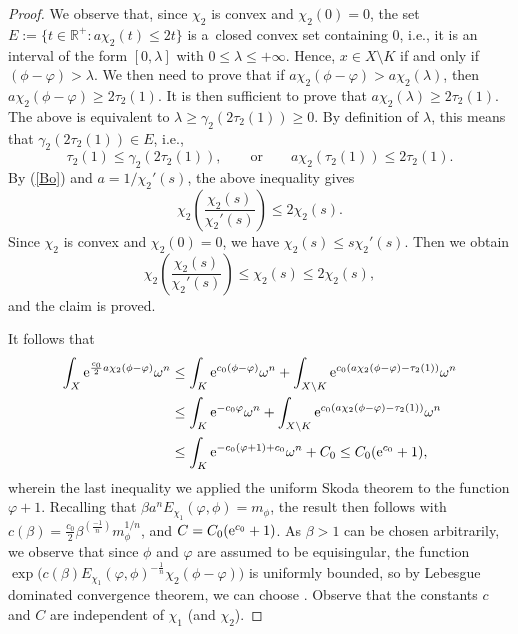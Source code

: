 \begin{proof}
We observe that, since $\chi_2$ is convex and $\chi_2(0) = 0$, the set $E:=\{ t \in \mathbb{R}^+ \colon a\chi_2(t) \leq 2 t \}$ is a~closed convex set containing $0$, i.e., it is an interval of the form $[0, \lambda]$ with $0 \leq \lambda \leq + \infty$. Hence, $x\in X\setminus K$ if and only if $(\phi-\varphi)>\lambda$.
We then need to prove that if $ a\chi_2( \phi - \varphi) > a\chi_2( \lambda)$,
then
$ a \chi_2( \phi - \varphi) \geq {2 \tau_2(1)}$. It is then sufficient to prove that $a\chi_2( \lambda) \geq 2 \tau_2(1)$. The above is equivalent to $ \lambda \geq \gamma_2(2 \tau_2(1)) \geq 0$. By definition of $\lambda$, this means that $\gamma_2(2 \tau_2(1))\in E$, i.e.,
\[\tau_2(1) \leq \gamma_2(2 \tau_2(1)),\qquad \text{or} \qquad a \chi_2(\tau_2(1)) \leq 2 \tau_2(1).\]
By (\ref{Bo}) and $a=1/\chi_2'(s)$, the above inequality gives
\[\chi_2\left(\frac{\chi_2( s)}{\chi_2' (s)} \right) \leq 2 \chi_2(s).\]
Since $\chi_2$ is convex and $\chi_2(0) = 0$, we have
$\chi_2(s) \leq s \chi_2'(s)$.
Then we obtain
\[ \chi_2\left(\frac{\chi_2( s)}{\chi_2' (s)} \right) \leq \chi_2(s) \leq 2 \chi_2(s),\]
and the claim is proved.

It follows that
\begin{align*}%
\int_X {\rm e}^{\frac{c_0}{2} a \chi_2(\phi-\varphi)} \omega^n &\leq \int_K {\rm e}^{c_0 (\phi-\varphi)} \omega^n + \int_{X\setminus K}{\rm e}^{c_0(a\chi_2(\phi-\varphi) -\tau_2(1))} \omega^n\\
 &\leq \int_K {\rm e}^{-c_0 \varphi} \omega^n + \int_{X\setminus K}{\rm e}^{c_0(a\chi_2(\phi-\varphi) -\tau_2(1))} \omega^n \\
 &\leq\int_K {\rm e}^{-c_0 (\varphi+1)+c_0} \omega^n + C_0\leq C_0({\rm e}^{c_0}+1),
\end{align*}
wherein the last inequality we applied the uniform Skoda theorem to the function $\varphi + 1$. Recalling that $\beta a^n E_{\chi_1}(\varphi, \phi) = m_\phi$, the result then follows with
$c(\beta) = \frac{c_0}{2} \beta^{(\frac{-1}{n})}m_\phi^{1/n}$, and $C= C_0({\rm e}^{c_0}+1)$.
As $\beta>1$ can be chosen arbitrarily, we observe that since $\phi$ and $\varphi$ are assumed to be equisingular, the function $\exp \big( c(\beta) E_{\chi_1}(\varphi, \phi)^{-\frac{1}{n}} \chi_2(\phi-\varphi)\big)$ is uniformly bounded, so by Lebesgue dominated convergence theorem, we can choose .
Observe that the constants $c$ and $C$ are independent of $\chi_1$ (and $\chi_2$).
\end{proof}

